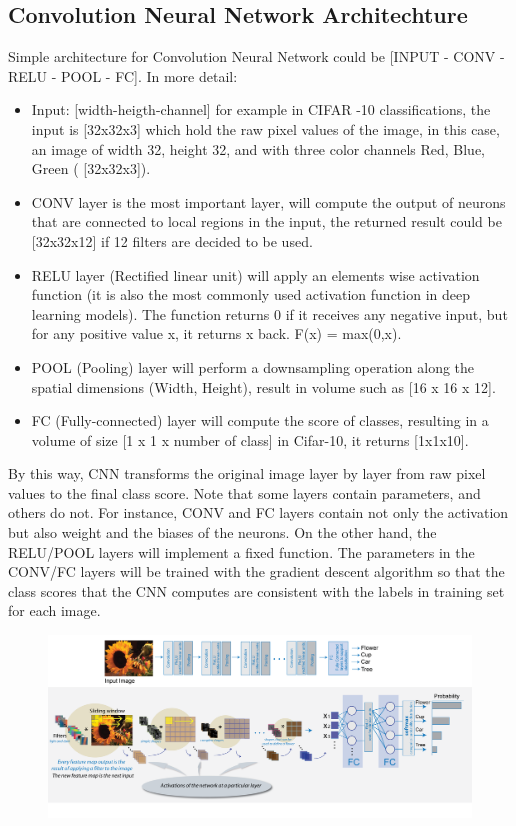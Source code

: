 \subsection{Convolution Neural Network Architechture}
Simple architecture for Convolution Neural Network could be [INPUT - CONV - RELU - POOL - FC]. In more detail:

\begin{itemize}
	\item Input: [width-heigth-channel] for example in CIFAR -10 classifications, the input is [32x32x3] which hold the raw pixel values of the image, in this case, an image of width 32, height 32, and with three color channels Red, Blue, Green ( [32x32x3]).
	\item CONV layer is the most important layer, will compute the output of neurons that are connected to local regions in the input, the returned result could be [32x32x12] if 12 filters are decided to be used.
	\item RELU layer (Rectified linear unit) will apply an elements wise activation function (it is also the most commonly used activation function in deep learning models). The function returns 0 if it receives any negative input, but for any positive value x, it returns x back. F(x) = max(0,x).
	\item POOL (Pooling) layer will perform a downsampling operation along the spatial dimensions (Width, Height), result in volume such as [16 x 16 x 12].
	\item FC (Fully-connected) layer will compute the score of classes, resulting in a volume of size [1 x 1 x number of class] in Cifar-10, it returns [1x1x10].
\end{itemize}
By this way, CNN transforms the original image layer by layer from raw pixel values to the final class score. Note that some layers contain parameters, and others do not. For instance, CONV and FC layers contain not only the activation but also weight and the biases of the neurons. On the other hand, the RELU/POOL layers will implement a fixed function. The parameters in the CONV/FC layers will be trained with the gradient descent algorithm so that the class scores that the CNN computes are consistent with the labels in training set for each image.\\
\begin{center}
  \begin{figure}[H]
  \centering
  \includegraphics[width=1\columnwidth]{images/chap2/Intro_CNN.png}
  \label{chap2:CNN arch}
  \end{figure}
\end{center}
